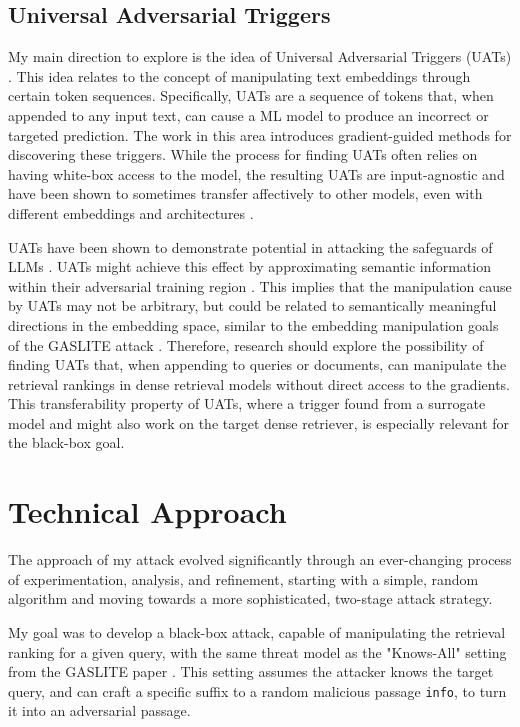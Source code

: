 \documentclass[a4paper, sigconf]{acmart}
\begin{document}
\subsection{Universal Adversarial Triggers}

My main direction to explore is the idea of Universal Adversarial Triggers (UATs) \cite{wallace2021}. This idea relates to the concept of manipulating text embeddings through certain token sequences. Specifically, UATs are a sequence of tokens that, when appended to any input text, can cause a ML model to produce an incorrect or targeted prediction. The work in this area introduces gradient-guided methods for discovering these triggers. While the process for finding UATs often relies on having white-box access to the model, the resulting UATs are input-agnostic and have been shown to sometimes transfer affectively to other models, even with different embeddings and architectures \cite{wallace2021}.

UATs have been shown to demonstrate potential in attacking the safeguards of LLMs \cite{liang2025}. UATs might achieve this effect by approximating semantic information within their adversarial training region \cite{subhash2023}. This implies that the manipulation cause by UATs may not be arbitrary, but could be related to semantically meaningful directions in the embedding space, similar to the embedding manipulation goals of the GASLITE attack \cite{bentov2024}. Therefore, research should explore the possibility of finding UATs that, when appending to queries or documents, can manipulate the retrieval rankings in dense retrieval models without direct access to the gradients. This transferability property of UATs, where a trigger found from a surrogate model and might also work on the target dense retriever, is especially relevant for the black-box goal. 


\section{Technical Approach}


The approach of my attack evolved significantly through an ever-changing process of experimentation, analysis, and refinement, starting with a simple, random algorithm and moving towards a more sophisticated, two-stage attack strategy. 

My goal was to develop a black-box attack, capable of manipulating the retrieval ranking for a given query, with the same threat model as the "Knows-All" setting from the GASLITE paper \cite{bentov2024}. This setting assumes the attacker knows the target query, and can craft a specific suffix to a random malicious passage \texttt{info}, to turn it into an adversarial passage. 
\end{document}
